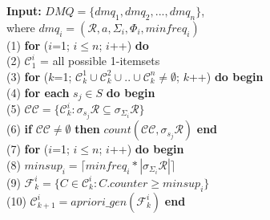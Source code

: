 \begin{figure}[h]
	\noindent
	\hspace*{6em}\textbf{Input:} $ DMQ = \{dmq_1, dmq_2, ..., dmq_n\} $, \\
	\noindent
	\hspace*{6em}where $ dmq_i = (\mathcal{R}, a, \Sigma_i, \Phi_i, minfreq_i) $ \\
	\hspace*{6em} (1) \hspace{1em} \textbf{for} ($i$=1; $i \leq n$; $i$++) \textbf{do} \\
	\hspace*{6em} (2) \hspace{2em}   $\mathcal{C}_1^i$ = {all possible 1-itemsets} \\
	\hspace*{6em} (3) \hspace{1em} \textbf{for} ($k$=1; $\mathcal{C}_k^1 \cup \mathcal{C}_k^2 \cup..\cup \mathcal{C}_k^n \neq \emptyset$; $k$++) \textbf{do begin} \\
	\hspace*{6em} (4) \hspace{2em}   \textbf{for each} $s_j \in S$ \textbf{do begin} \\
	\hspace*{6em} (5) \hspace{3em}       $\mathcal{C}\mathcal{C}= \{\mathcal{C}_k^i : \sigma_{s_j}\mathcal{R}
	\subseteq \sigma_{\Sigma_i}\mathcal{R}\}$ \\
	\hspace*{6em} (6) \hspace{3em}       \textbf{if} $\mathcal{C}\mathcal{C} \neq \emptyset $
	\textbf{then} $ count(\mathcal{C}\mathcal{C}, \sigma_{s_j}\mathcal{R}) $ \textbf{end} \\
	\hspace*{6em} (7) \hspace{2em}    \textbf{for} ($i$=1; $i \leq n$; $i$++) \textbf{do begin} \\
	\hspace*{6em} (8) \hspace{3em}      $minsup_i = \lceil minfreq_i * |\sigma_{\Sigma_i}\mathcal{R}| \rceil$  \\
	\hspace*{6em} (9) \hspace{3em}      $\mathcal{F}_k^i = \{C \in \mathcal{C}_k^i : C.counter \geq minsup_i\} $ 	 \\
	\hspace*{6em} (10)\hspace{3em}      $\mathcal{C}_{k+1}^i = apriori\_gen(\mathcal{F}_k^i)$ \textbf{end} \\

\end{figure}
